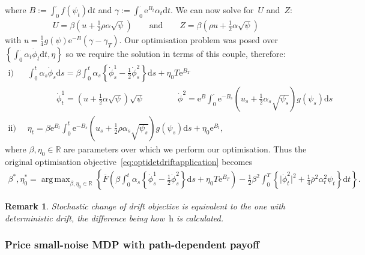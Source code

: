 \documentclass{amsart}[11pt]
\numberwithin{equation}{section}
\numberwithin{theorem}{subsection}
\numberwithin{proposition}{subsection}
\numberwithin{definition}{subsection}
\numberwithin{lemma}{subsection}
\newtheorem*{remark}{Remark}
\numberwithin{assumption}{subsection}
\newcommand{\RR}{\mathbb{R}}
\newcommand{\brho}{\overline{\rho}}
\newcommand{\D}{\mathrm{d}}
\newcommand{\E}{\mathrm{e}}
\newcommand{\hh}{\boldsymbol{\mathrm{h}}}
\DeclareMathOperator*{\argmax}{arg\,max}
\begin{document}
where $B:=\int_{0}^{\cdot} f(\psi_t)\D t$ and $\gamma := \int_{0}^{\cdot} \E^{B_t}\alpha_t \D t$. 
We can now solve for~$U$ and~$Z$:
\begin{align*}
U = \beta\left( u + \frac{1}{2}\rho\alpha\sqrt{\psi} \right) \qquad \text{and} \qquad
Z = \beta\left ( \rho u + \frac{1}{2}\alpha\sqrt{\psi} \right )
\end{align*}
with $u = \frac{1}{4}g(\psi)\E^{-B}(\gamma-\gamma_T)$. Our optimisation problem was posed over $\left \{\int_{0}^{\cdot} \alpha_t \dot{\phi}_t \D t, \eta\right \}$ so we require the solution in terms of this couple, therefore:
\begin{align*}
\text{i)}& \;\; \int_0^t \alpha_s \dot{\phi}_s \D s = \beta\int_0^t \alpha_s \left \{ \dot{\phi}^1_s - \frac{1}{2}\dot{\phi}^2_s \right \}\D s + \eta_0 T \E^{B_T} \\
& \qquad \qquad  \dot{\phi}^1_t = (u+ \frac{1}{2}\alpha \sqrt{\psi})\sqrt{\psi} \qquad \qquad \dot{\phi}^2 = \E^B \int_{0}^{\cdot} \E^{-B_s}\left( u_s + \frac{1}{2}\alpha_s\sqrt{\psi_s} \right )g(\psi_s)\D s \\
\text{ii)}& \;\; \eta_t = \beta \E^{B_t} \int_0^t \E^{-B_s}\left( u_s + \frac{1}{2}\rho\alpha_s\sqrt{\psi_s} \right )g(\psi_s)\D s + \eta_0 \E^{B_t},
\end{align*}
where $\beta,\eta_0\in\RR$ are parameters over which we perform our optimisation. 
Thus the original optimisation objective~\eqref{eq:optidetdriftapplication} becomes 
\begin{align*}
\beta^{*}, \eta_0^{*} = \argmax_{\beta,\eta_0\in\RR}
\left\{\overline{F}\left( \beta\int_0^t \alpha_s \left \{ \dot{\phi}^1_s - \frac{1}{2}\dot{\phi}^2_s \right \}\D s + \eta_0 T \E^{B_T} \right ) - \frac{1}{2}\beta^2\int_0^T\left\{ \big| \dot{\phi}^2_t \big|^2 + \frac{1}{4}\brho^2\alpha_t^2\psi_t \right\}\D t\right\}.
\end{align*}

\begin{remark}
Stochastic change of drift objective is equivalent to the one with deterministic drift, 
the difference being how~$\hh$ is calculated.
\end{remark}

\subsubsection{Price small-noise MDP with path-dependent payoff}
\end{document}
